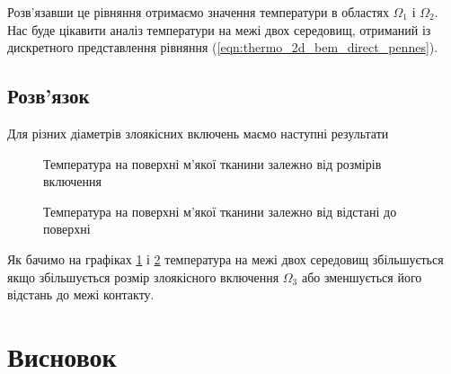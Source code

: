 Розв'язавши це рівняння отримаємо значення температури в областях $\Omega_1$ і $\Omega_2$. Нас буде цікавити аналіз 
температури на межі двох середовищ, отриманий із дискретного представлення рівняння 
(\ref{eqn:thermo_2d_bem_direct_pennes}). 

\subsection{Розв'язок}

Для різних діаметрів злоякісних включень маємо наступні результати

\begin{figure}[ht!]
    \centering
    \caption{Температура на поверхні м'якої тканини залежно від розмірів включення}
    \label{fig:thermo_2d_solution_border_temp_size}
\end{figure}

\begin{figure}[ht!]
    \centering
    \caption{Температура на поверхні м'якої тканини залежно від відстані до поверхні}
    \label{fig:thermo_2d_solution_border_temp_depth}
\end{figure}

Як бачимо на графіках \ref{fig:thermo_2d_solution_border_temp_size} і \ref{fig:thermo_2d_solution_border_temp_depth}
температура на межі двох середовищ збільшується якщо збільшується розмір злоякісного включення $\Omega_3$ або 
зменшується його відстань до межі контакту.

\section{Висновок}

